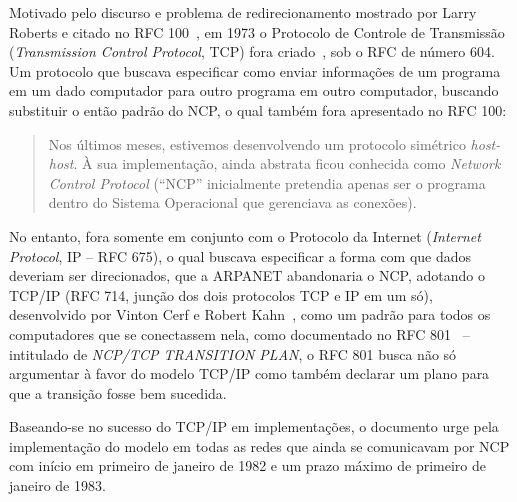 \documentclass[conference]{IEEEtran}
\begin{document}

  Motivado pelo discurso e problema de redirecionamento mostrado por Larry
  Roberts e citado no RFC 100~\cite{rfc100}, em 1973 o Protocolo de Controle de
  Transmissão (\emph{Transmission Control Protocol}, TCP) fora criado~\cite{framingyears}, sob o RFC de número 604. Um protocolo que buscava especificar como enviar informações de um programa em um dado computador para outro programa em outro computador, buscando substituir o então padrão do NCP, o qual também fora apresentado no RFC 100:

  \begin{quote}

    Nos últimos meses, estivemos desenvolvendo um protocolo simétrico
    \emph{host-host}. À sua implementação, ainda abstrata ficou conhecida como 
    \emph{Network Control Protocol} (``NCP'' inicialmente pretendia apenas ser o
    programa dentro do Sistema Operacional que gerenciava as conexões).
    ~\cite{rfc100}
    
  \end{quote}
  
  No entanto, fora somente em conjunto com o Protocolo da Internet
  (\emph{Internet Protocol}, IP -- RFC 675), o
  qual buscava especificar a forma com que dados deveriam ser direcionados, que a
  ARPANET abandonaria o NCP, adotando o TCP/IP (RFC 714, junção dos dois
  protocolos TCP e IP em um só), desenvolvido por
  Vinton Cerf e Robert Kahn~\cite{fromarpanet}, como um padrão para todos os
  computadores que se conectassem nela, como documentado no RFC 801~\cite{rfc801} -- intitulado de \emph{NCP/TCP TRANSITION PLAN}, o RFC 801 busca não só argumentar à favor do modelo TCP/IP como também declarar um plano para que a transição fosse bem sucedida.
  
  Baseando-se no sucesso do TCP/IP em implementações, o documento urge pela implementação do modelo em todas as redes que ainda se comunicavam por NCP com início em primeiro de janeiro de 1982 e um prazo máximo de primeiro de janeiro  de 1983.~\cite{rfc801}
  
\end{document}
